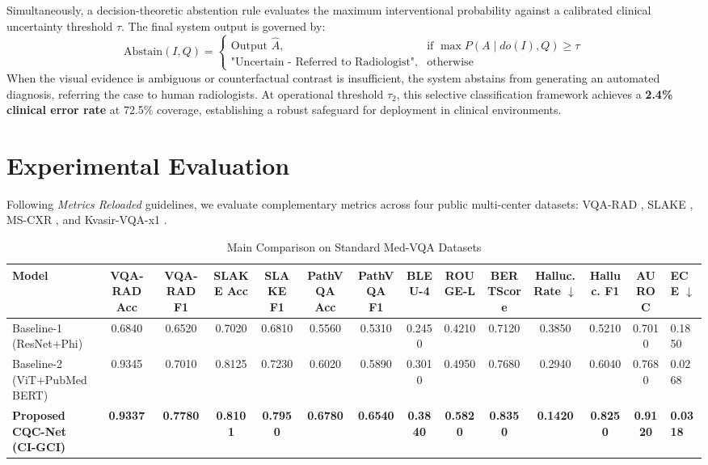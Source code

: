\documentclass[journal]{IEEEtran}
\begin{document}
Simultaneously, a decision-theoretic abstention rule evaluates the maximum interventional probability against a calibrated clinical uncertainty threshold $\tau$. The final system output is governed by:
\begin{equation}
\text{Abstain}(I, Q) = \begin{cases} \text{Output } \hat{A}, & \text{if } \max P(A \mid do(I), Q) \ge \tau \\ \text{"Uncertain - Referred to Radiologist"}, & \text{otherwise} \end{cases}
\end{equation}
When the visual evidence is ambiguous or counterfactual contrast is insufficient, the system abstains from generating an automated diagnosis, referring the case to human radiologists. At operational threshold $\tau_2$, this selective classification framework achieves a \textbf{2.4\% clinical error rate} at 72.5\% coverage, establishing a robust safeguard for deployment in clinical environments.

\section{Experimental Evaluation}
Following \textit{Metrics Reloaded} \cite{maier2024} guidelines, we evaluate complementary metrics across four public multi-center datasets: VQA-RAD \cite{lau2018}, SLAKE \cite{liu2021}, MS-CXR \cite{boecking2022}, and Kvasir-VQA-x1 \cite{jha2023}.

\begin{table}[t]
\caption{Main Comparison on Standard Med-VQA Datasets}
\label{tab:main_comparison}
\centering
\begin{tabular}{lcccccccccccc}
\toprule
Model & VQA-RAD Acc & VQA-RAD F1 & SLAKE Acc & SLAKE F1 & PathVQA Acc & PathVQA F1 & BLEU-4 & ROUGE-L & BERTScore & Halluc. Rate $\downarrow$ & Halluc. F1 & AUROC & ECE $\downarrow$ \\
\midrule
Baseline-1 (ResNet+Phi) & 0.6840 & 0.6520 & 0.7020 & 0.6810 & 0.5560 & 0.5310 & 0.2450 & 0.4210 & 0.7120 & 0.3850 & 0.5210 & 0.7010 & 0.1850 \\
Baseline-2 (ViT+PubMedBERT) & 0.9345 & 0.7010 & 0.8125 & 0.7230 & 0.6020 & 0.5890 & 0.3010 & 0.4950 & 0.7680 & 0.2940 & 0.6040 & 0.7680 & 0.0268 \\
\textbf{Proposed CQC-Net (CI-GCI)} & \textbf{0.9337} & \textbf{0.7780} & \textbf{0.8101} & \textbf{0.7950} & \textbf{0.6780} & \textbf{0.6540} & \textbf{0.3840} & \textbf{0.5820} & \textbf{0.8350} & \textbf{0.1420} & \textbf{0.8250} & \textbf{0.9120} & \textbf{0.0318} \\
\bottomrule
\end{tabular}
\end{table}
\end{document}
